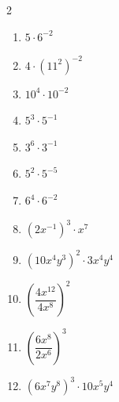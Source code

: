\documentclass[11pt]{article}
\begin{document}
\begin{multicols}{2}
\begin{enumerate}
  \item $5 \cdot 6^{-2}$
  \vspace{1.3cm}
  \item $4 \cdot (11^{2})^{-2}$
  \vspace{1.3cm}
  \item $10^{4} \cdot 10^{-2}$
  \vspace{1.3cm}
  \item $5^{3} \cdot 5^{-1}$
  \vspace{1.3cm}
  \item $3^{6} \cdot 3^{-1}$
  \vspace{1.3cm}
  \item $5^{2} \cdot 5^{-5}$
  \vspace{1.3cm}
  \item $6^{4} \cdot 6^{-2}$
  \vspace{1.3cm}
  \item $(2x^{-1})^{3} \cdot x^{7}$
  \vspace{1.3cm}
  \item $(10x^{4}y^{3})^{2} \cdot 3x^{4}y^{4}$
  \vspace{1.3cm}
  \item $\left(\dfrac{4x^{12}}{4x^{8}}\right)^{2}$
  \vspace{1.3cm}
  \item $\left(\dfrac{6x^{8}}{2x^{6}}\right)^{3}$
  \vspace{1.3cm}
  \item $(6x^{7}y^{8})^{3} \cdot 10x^{5}y^{4}$
  \vspace{1.3cm}
\end{enumerate}
\end{multicols}
\end{document}
